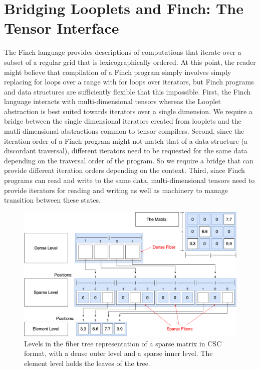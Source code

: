 \section{Bridging Looplets and Finch: The Tensor Interface}
%
The Finch language provides descriptions of computations that iterate over a subset of a regular grid that is lexicographically ordered.
%
At this point, the reader might believe that compilation of a Finch program simply involves simply replacing for loops over a range with for loops over iterators, but Finch programs and data structures are sufficiently flexible that this impossible.
%
First, the Finch language interacts with multi-dimensional tensors whereas the Looplet abstraction is best suited towards iterators over a single dimension.
%
We require a bridge between the single dimensional iterators created from looplets and the mutli-dimensional abstractions common to tensor compilers.
%
Second, since the iteration order of a Finch program might not match that of a data structure (a discordant traversal), different iterators need to be requested for the same data depending on the traversal order of the program.
%
So we require a bridge that can provide different iteration orders depending on the context.
%
Third, since Finch programs can read and write to the same data, multi-dimensional tensors need to provide iterators for reading and writing as well as machinery to manage transition between these states.

\begin{figure}
    \centering
    \includegraphics[width=\linewidth]{LevelsVsFibers-matrix.png}
    \caption{Levels in the fiber tree representation of a sparse matrix in CSC format, with a dense outer level and a sparse inner level. The element level holds the leaves of the tree.}
    \label{fig:levelsvsfibers}
\end{figure}

